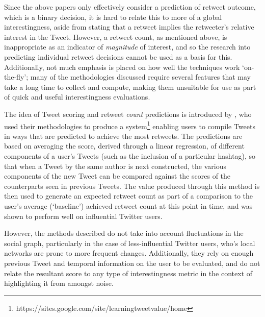 Since the above papers only effectively consider a prediction of retweet outcome, which is a binary decision, it is hard to relate this to more of a global interestingness, aside from stating that a retweet implies the retweeter's relative interest in the Tweet. However, a retweet count, as mentioned above, is inappropriate as an indicator of \textit{magnitude} of interest, and so the research into predicting individual retweet decisions cannot be used as a basis for this. Additionally, not much emphasis is placed on how well the techniques work `on-the-fly'; many of the methodologies discussed require several features that may take a long time to collect and compute, making them unsuitable for use as part of quick and useful interestingness evaluations.

The idea of Tweet scoring and retweet \textit{count} predictions is introduced by \cite{gransee12}, who used their methodologies to produce a system\footnote{https://sites.google.com/site/learningtweetvalue/home} enabling users to compile Tweets in ways that are predicted to achieve the most retweets. The predictions are based on averaging the score, derived through a linear regression, of different components of a user's Tweets (such as the inclusion of a particular hashtag), so that when a Tweet by the same author is next constructed, the various components of the new Tweet can be compared against the scores of the counterparts seen in previous Tweets. The value produced through this method is then used to generate an expected retweet count as part of a comparison to the user's average (`baseline') achieved retweet count at this point in time, and was shown to perform well on influential Twitter users.

However, the methods described do not take into account fluctuations in the social graph, particularly in the case of less-influential Twitter users, who's local networks are prone to more frequent changes. Additionally, they rely on enough previous Tweet and temporal information on the user to be evaluated, and do not relate the resultant score to any type of interestingness metric in the context of highlighting it from amongst noise.

